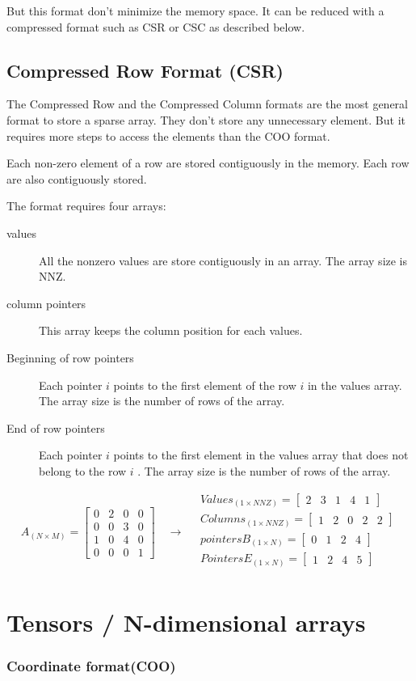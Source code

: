 But this format don't minimize the memory space. It can be reduced with a compressed format such as CSR or CSC as described below.

\subsection{Compressed Row Format (CSR)}
The Compressed Row and the Compressed Column formats are the most general format to store a sparse array. They don't store any unnecessary element. But it requires more steps to access the elements than the COO format. 

Each non-zero element of a row are stored contiguously in the memory. Each row are also contiguously stored.

The format requires four arrays:
\begin{description}
	\item [values] All the nonzero values are store contiguously in an array. The array size is {NNZ}.
	\item [column pointers] This array keeps the column position for each values.
	\item [Beginning of row pointers] Each pointer $i$ points to the first element of the row $i$ in the values array. The array size is the number of rows of the array.
	\item [End of row pointers]  Each pointer $i$ points to the first element in the values array that does not belong to the row $i$ . The array size is the number of rows of the array.
\end{description}

\[
A_{(N\times M)} = 
\begin{bmatrix}
0 &  2 & 0 & 0\\
0 &  0 & 3 & 0\\
1 &  0 & 4 & 0\\
0 &  0 & 0 & 1
\end{bmatrix}
\quad\rightarrow\quad
\begin{aligned}
Values_{(1\times NNZ)} = 
\begin{bmatrix}
2 &  3 & 1 & 4 & 1
\end{bmatrix}
\\
Columns_{(1\times NNZ)} = 
\begin{bmatrix}
1 &  2 & 0 & 2 & 2
\end{bmatrix}
\\
pointersB_{(1\times N)} = 
\begin{bmatrix}
0 & 1 & 2 & 4 
\end{bmatrix}
\\
PointersE_{(1\times N)} = 
\begin{bmatrix}
1 & 2 & 4 & 5
\end{bmatrix}
\\
\end{aligned}
\]

\section{Tensors / N-dimensional arrays}

\subsubsection{Coordinate format(COO)}
